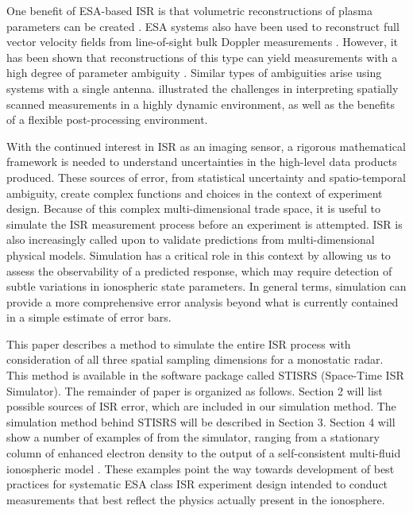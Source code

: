 \documentclass[draft,ras]{agutex}
\begin{document}
\begin{article}
One benefit of ESA-based ISR is that volumetric reconstructions of plasma parameters can be created \citep{Semeter2009738, Nicolls:2007ie, dahlgren2012di}. ESA systems also have been used to reconstruct full vector velocity fields from line-of-sight bulk Doppler measurements \citep{butler:imagingfregiondrifts,RDS:RDS20195}. However, it has been shown that reconstructions of this type can yield measurements with a high degree of parameter ambiguity \citep{Dahlgren:2012dq}. Similar types of ambiguities arise using systems with a single antenna.  \citet{Semeter:2005fo} illustrated the challenges in interpreting spatially scanned measurements in a highly dynamic environment, as well as the benefits of a flexible post-processing environment.

With the continued interest in ISR as an imaging sensor, a rigorous mathematical framework is needed to understand uncertainties in the high-level data products produced.  These sources of error, from statistical uncertainty and spatio-temporal ambiguity, create complex functions and choices in the context of experiment design. Because of this complex multi-dimensional trade space, it is useful to simulate the ISR measurement process before an experiment is attempted.  ISR is also increasingly called upon to validate predictions from multi-dimensional physical models.  Simulation has a critical role in this context by allowing us to assess the observability of a predicted  response, which may require detection of subtle variations in ionospheric state parameters.   In general terms, simulation can provide a more comprehensive error analysis beyond what is currently contained in a simple estimate of error bars. 

This paper describes a method to simulate the entire ISR process with consideration of all three spatial sampling dimensions for a monostatic radar. This method is available in the software package called STISRS (Space-Time ISR Simulator).  
The remainder of paper is organized as follows. Section 2 will list possible sources of ISR error, which are included in our simulation method. The simulation method behind STISRS will be described in Section 3. Section 4 will show a number of examples of from the simulator, ranging from a stationary column of enhanced electron density to the output of a self-consistent multi-fluid ionospheric model \citep{semeter:plasmatransport2012}. These examples point the way towards development of best practices for systematic ESA class ISR experiment design intended to conduct measurements that best reflect the physics actually present in the ionosphere.

\end{article}
\end{document}
